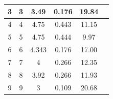 \documentclass{article}
\begin{document}
\begin{table}[h]
\begin{tabular}{|c|c|c|c|c|c|}
3                                                    & 3                                                  & 3.49                                                            & 0.176                                                      & 19.84                                                             &                                                                    \\ \hline
4                                                    & 4                                                  & 4.75                                                            & 0.443                                                      & 11.15                                                             &                                                                    \\ \hline
5                                                    & 5                                                  & 4.75                                                            & 0.444                                                      & 9.97                                                              &                                                                    \\ \hline
6                                                    & 6                                                  & 4.343                                                           & 0.176                                                      & 17.00                                                             &                                                                    \\ \hline
7                                                    & 7                                                  & 4                                                               & 0.266                                                      & 12.35                                                             &                                                                    \\ \hline
8                                                    & 8                                                  & 3.92                                                            & 0.266                                                      & 11.93                                                             &                                                                    \\ \hline
9                                                    & 9                                                  & 3                                                               & 0.109                                                      & 20.68                                                             &                                                                    \\ \hline

\end{tabular}
\end{table}
\end{document}
